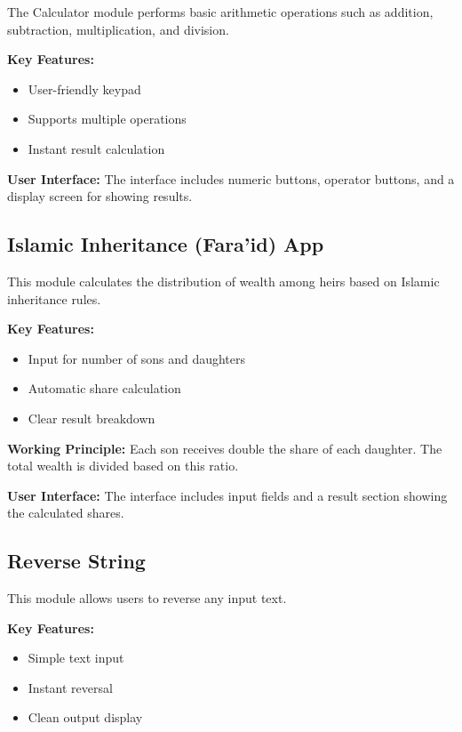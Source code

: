 \documentclass{article}
\begin{document}
The Calculator module performs basic arithmetic operations such as addition, subtraction, multiplication, and division.

\textbf{Key Features:}
\begin{itemize}
\item User-friendly keypad
\item Supports multiple operations
\item Instant result calculation
\end{itemize}

\textbf{User Interface:}
The interface includes numeric buttons, operator buttons, and a display screen for showing results.

\subsection{Islamic Inheritance (Fara’id) App}

This module calculates the distribution of wealth among heirs based on Islamic inheritance rules.

\textbf{Key Features:}
\begin{itemize}
\item Input for number of sons and daughters
\item Automatic share calculation
\item Clear result breakdown
\end{itemize}

\textbf{Working Principle:}
Each son receives double the share of each daughter. The total wealth is divided based on this ratio.

\textbf{User Interface:}
The interface includes input fields and a result section showing the calculated shares.

\subsection{Reverse String}

This module allows users to reverse any input text.

\textbf{Key Features:}
\begin{itemize}
\item Simple text input
\item Instant reversal
\item Clean output display
\end{itemize}
\end{document}
